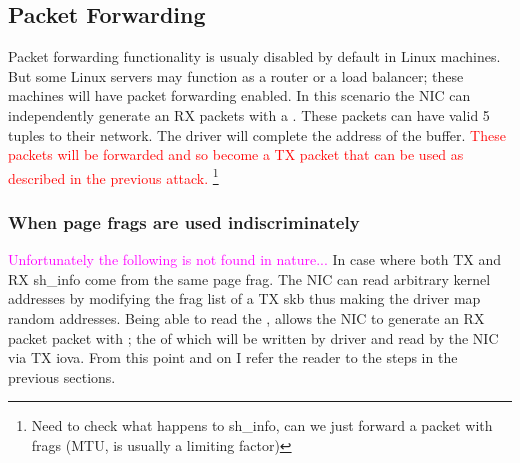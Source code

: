 \subsection{Packet Forwarding}
Packet forwarding functionality is usualy disabled by default in Linux machines. But some Linux servers may function as a router or a load balancer; these machines will have packet forwarding enabled. In this scenario the NIC can independently generate an RX packets with a \mabaf. These packets can have valid 5 tuples to their network. The driver will complete the \page address of the buffer. \textcolor{red}{These packets will be forwarded and so become a TX packet that can be used as described in the previous attack.} \footnote{Need to check what happens to sh\_info, can we just forward a packet with frags (MTU, is usually a limiting factor)}

\subsubsection{When page frags are used indiscriminately}
\textcolor{magenta}{Unfortunately the following is not found in nature...}\newline
In case where both TX and RX sh\_info come from the same page frag. The NIC can read arbitrary kernel addresses by modifying the frag list of a TX skb thus making the driver map random addresses.
Being able to read the \shinfo, allows the NIC to generate an RX packet packet with \mabaf; the \kva of which will be written by driver and read by the NIC via TX iova. From this point and on I refer the reader to the steps in the previous sections.